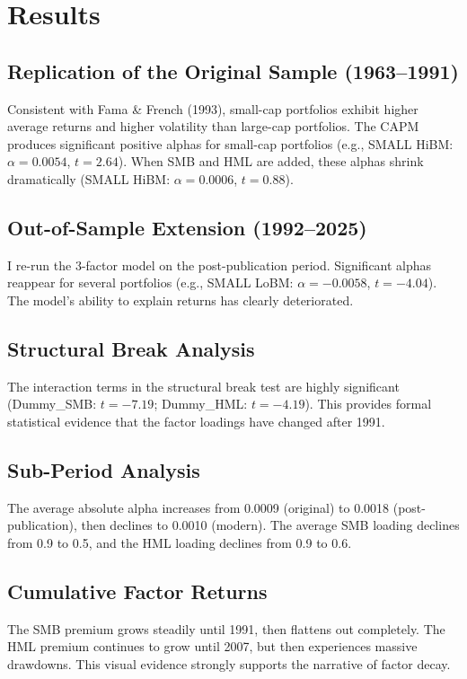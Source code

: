 \documentclass[11pt]{article}
\begin{document}
\section{Results}
\subsection{Replication of the Original Sample (1963--1991)}
Consistent with Fama \& French (1993), small-cap portfolios exhibit higher average returns and higher volatility than large-cap portfolios. The CAPM produces significant positive alphas for small-cap portfolios (e.g., SMALL HiBM: $\alpha = 0.0054$, $t = 2.64$). When SMB and HML are added, these alphas shrink dramatically (SMALL HiBM: $\alpha = 0.0006$, $t = 0.88$).

\subsection{Out-of-Sample Extension (1992--2025)}
I re-run the 3-factor model on the post-publication period. Significant alphas reappear for several portfolios (e.g., SMALL LoBM: $\alpha = -0.0058$, $t = -4.04$). The model's ability to explain returns has clearly deteriorated.

\subsection{Structural Break Analysis}
The interaction terms in the structural break test are highly significant (Dummy\_SMB: $t = -7.19$; Dummy\_HML: $t = -4.19$). This provides formal statistical evidence that the factor loadings have changed after 1991.

\subsection{Sub-Period Analysis}
The average absolute alpha increases from 0.0009 (original) to 0.0018 (post-publication), then declines to 0.0010 (modern). The average SMB loading declines from 0.9 to 0.5, and the HML loading declines from 0.9 to 0.6.

\subsection{Cumulative Factor Returns}
The SMB premium grows steadily until 1991, then flattens out completely. The HML premium continues to grow until 2007, but then experiences massive drawdowns. This visual evidence strongly supports the narrative of factor decay.
\end{document}
